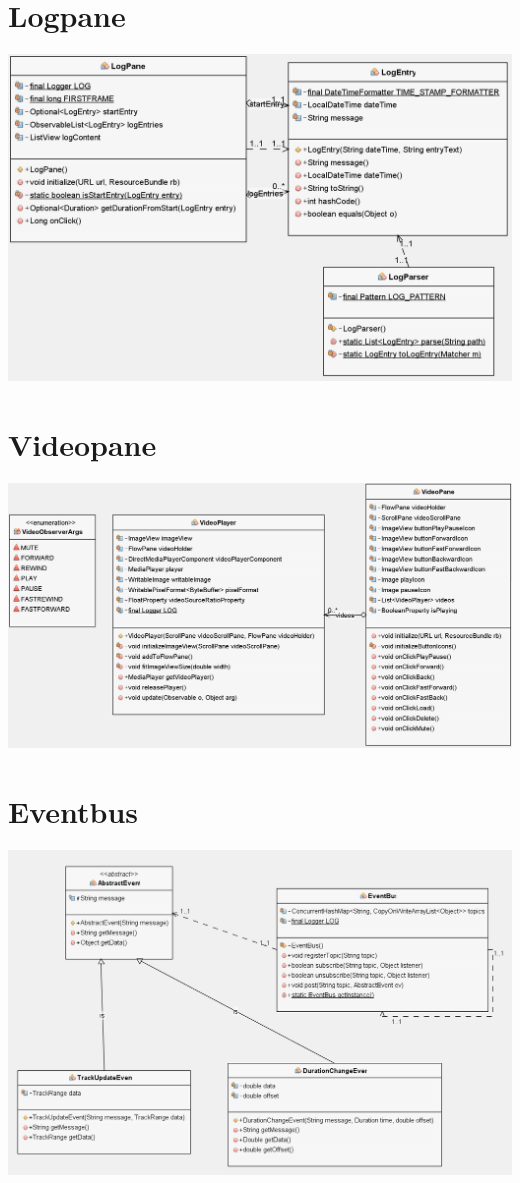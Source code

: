 \section{Logpane}
\includegraphics[scale=0.4]{logUML}
\section{Videopane}
\includegraphics[scale=0.3]{videoUML}
\section{Eventbus}
\includegraphics[scale=0.5]{eventUML}